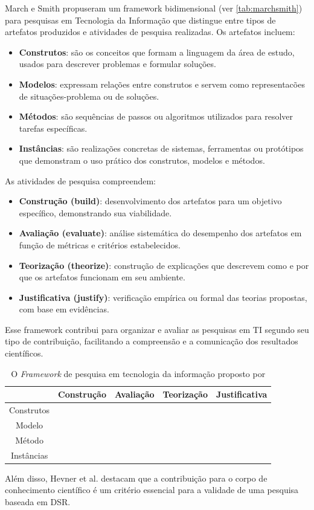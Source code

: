 March e Smith \cite{march1995design} propuseram um framework bidimensional (ver \autoref{tab:marchsmith}) para pesquisas em Tecnologia da Informação que distingue entre tipos de artefatos produzidos e atividades de pesquisa realizadas. Os artefatos incluem:
\begin{itemize}
    \item \textbf{Construtos}: são os conceitos que formam a linguagem da área de estudo, usados para descrever problemas e formular soluções.
    \item \textbf{Modelos}: expressam relações entre construtos e servem como representacões de situações-problema ou de soluções.
    \item \textbf{Métodos}: são sequências de passos ou algoritmos utilizados para resolver tarefas específicas.
    \item \textbf{Instâncias}: são realizações concretas de sistemas, ferramentas ou protótipos que demonstram o uso prático dos construtos, modelos e métodos.
\end{itemize}

As atividades de pesquisa compreendem:
\begin{itemize}
    \item \textbf{Construção (build)}: desenvolvimento dos artefatos para um objetivo específico, demonstrando sua viabilidade.
    \item \textbf{Avaliação (evaluate)}: análise sistemática do desempenho dos artefatos em função de métricas e critérios estabelecidos.
    \item \textbf{Teorização (theorize)}: construção de explicações que descrevem como e por que os artefatos funcionam em seu ambiente.
    \item \textbf{Justificativa (justify)}: verificação empírica ou formal das teorias propostas, com base em evidências.
\end{itemize}

Esse framework contribui para organizar e avaliar as pesquisas em TI segundo seu tipo de contribuição, facilitando a compreensão e a comunicação dos resultados científicos.





\begin{table}[hbt]
    \centering
    \begin{tabular}{|c|c|c|c|c|}
    \hline
       & Construção & Avaliação & Teorização & Justificativa  \\    \hline
    Construtos &&&&\\     \hline
    Modelo &&&&\\    \hline
    Método &&&&\\    \hline
    Instâncias &&&&\\    \hline
    \end{tabular}
    \caption{O \textit{Framework} de pesquisa em tecnologia da informação proposto por \citet{march1995design}}
    \label{tab:marchsmith}
\end{table}

Além disso, Hevner et al. \cite{hevner2004design} destacam que a contribuição para o corpo de conhecimento científico é um critério essencial para a validade de uma pesquisa baseada em DSR.

